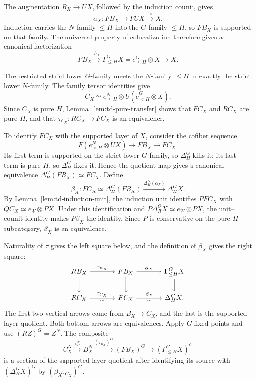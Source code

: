 \documentclass[11pt,reqno]{amsart}
\theoremstyle{definition}
\theoremstyle{remark}
\theoremstyle{plain}
\numberwithin{equation}{section}
\begin{document}
The augmentation \(B_X\to UX\), followed by the induction counit,
gives
\[
 \alpha_X:FB_X\longrightarrow FUX
              \xrightarrow{\epsilon_X}X.
\]
Induction carries the \(N\)-family \(\le H\) into the
\(G\)-family \(\le H\), so \(FB_X\) is supported on that family.
The universal property of colocalization therefore gives a
canonical factorization
\[
 FB_X\xrightarrow{\bar\alpha_X}
 \Gamma_{\le H}^G X=e_{\le H}^G\otimes X
 \longrightarrow X.
\]

The restricted strict lower \(G\)-family meets the
\(N\)-family \(\le H\) in exactly the strict lower \(N\)-family.
The family tensor identities give
\[
 C_X\simeq e_{\le H}^N\otimes
            U(\widetilde e_{<H}^G\otimes X).
\]
Since \(C_X\) is pure \(H\), Lemma~\ref{lem:td-pure-transfer}
shows that \(FC_X\) and \(RC_X\) are pure \(H\), and that
\(\tau_{C_X}:RC_X\to FC_X\) is an equivalence.

To identify \(FC_X\) with the supported layer of \(X\), consider
the cofiber sequence
\[
 F(e_{<H}^N\otimes UX)\longrightarrow FB_X\longrightarrow FC_X.
\]
Its first term is supported on the strict lower \(G\)-family,
so \(\Delta_H^G\) kills it; its last term is pure \(H\), so
\(\Delta_H^G\) fixes it. Hence the quotient map gives a canonical
equivalence \(\Delta_H^G(FB_X)\simeq FC_X\). Define
\begin{equation}\label{eq:td-induced-layer}
 \beta_X:FC_X
 \simeq\Delta_H^G(FB_X)
 \xrightarrow{\Delta_H^G(\alpha_X)}\Delta_H^G X.
\end{equation}
By Lemma~\ref{lem:td-induction-unit}, the induction unit identifies
\(PFC_X\) with \(QC_X\simeq e_W\otimes PX\).
Under this identification and
\(P\Delta_H^G X\simeq e_W\otimes PX\), the unit--counit identity
makes \(P\beta_X\) the identity.
Since \(P\) is conservative on the pure \(H\)-subcategory,
\(\beta_X\) is an equivalence.

Naturality of \(\tau\) gives the left square below, and the
definition of \(\beta_X\) gives the right square:
\[
\begin{tikzcd}[column sep=large]
 RB_X \arrow[r,"\tau_{B_X}"] \arrow[d]
   & FB_X \arrow[r,"\bar\alpha_X"] \arrow[d]
   & \Gamma_{\le H}^G X \arrow[d]\\
 RC_X \arrow[r,"\tau_{C_X}","\sim"']
   & FC_X \arrow[r,"\beta_X","\sim"']
   & \Delta_H^G X .
\end{tikzcd}
\]
The first two vertical arrows come from \(B_X\to C_X\), and
the last is the supported-layer quotient.
Both bottom arrows are equivalences. Apply \(G\)-fixed points and
use \((RZ)^G=Z^N\). The composite
\[
 C_X^N\xrightarrow{t_H^N}B_X^N
 \xrightarrow{(\tau_{B_X})^G}(FB_X)^G
 \longrightarrow(\Gamma_{\le H}^G X)^G
\]
is a section of the supported-layer quotient after identifying its
source with \((\Delta_H^G X)^G\) by
\((\beta_X\tau_{C_X})^G\).
\end{document}
